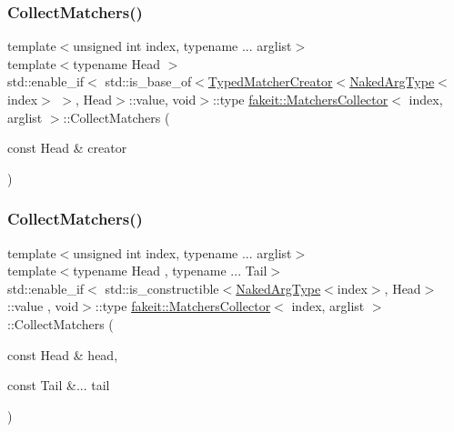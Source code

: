 \mbox{\label{classfakeit_1_1MatchersCollector_ae954aa74286bcd096169067f5e897356}} 
\subsubsection{\texorpdfstring{CollectMatchers()}{CollectMatchers()}\hspace{0.1cm}{\footnotesize\ttfamily [31/63]}}
{\footnotesize\ttfamily template$<$unsigned int index, typename ... arglist$>$ \\
template$<$typename Head $>$ \\
std\+::enable\+\_\+if$<$ std\+::is\+\_\+base\+\_\+of$<$\mbox{\hyperlink{structfakeit_1_1TypedMatcherCreator}{Typed\+Matcher\+Creator}}$<$\mbox{\hyperlink{classfakeit_1_1MatchersCollector_aeda8ced6a2f0cb7c6e4f916f18a91730}{Naked\+Arg\+Type}}$<$index$>$ $>$, Head$>$\+::value, void$>$\+::type \mbox{\hyperlink{classfakeit_1_1MatchersCollector}{fakeit\+::\+Matchers\+Collector}}$<$ index, arglist $>$\+::Collect\+Matchers (\begin{DoxyParamCaption}\item[{const Head \&}]{creator }\end{DoxyParamCaption})\hspace{0.3cm}{\ttfamily [inline]}}

\mbox{\label{classfakeit_1_1MatchersCollector_a29c5245d03b8fab3773455c087edde74}} 
\subsubsection{\texorpdfstring{CollectMatchers()}{CollectMatchers()}\hspace{0.1cm}{\footnotesize\ttfamily [32/63]}}
{\footnotesize\ttfamily template$<$unsigned int index, typename ... arglist$>$ \\
template$<$typename Head , typename ... Tail$>$ \\
std\+::enable\+\_\+if$<$ std\+::is\+\_\+constructible$<$\mbox{\hyperlink{classfakeit_1_1MatchersCollector_aeda8ced6a2f0cb7c6e4f916f18a91730}{Naked\+Arg\+Type}}$<$index$>$, Head$>$\+::value , void$>$\+::type \mbox{\hyperlink{classfakeit_1_1MatchersCollector}{fakeit\+::\+Matchers\+Collector}}$<$ index, arglist $>$\+::Collect\+Matchers (\begin{DoxyParamCaption}\item[{const Head \&}]{head,  }\item[{const Tail \&...}]{tail }\end{DoxyParamCaption})\hspace{0.3cm}{\ttfamily [inline]}}

